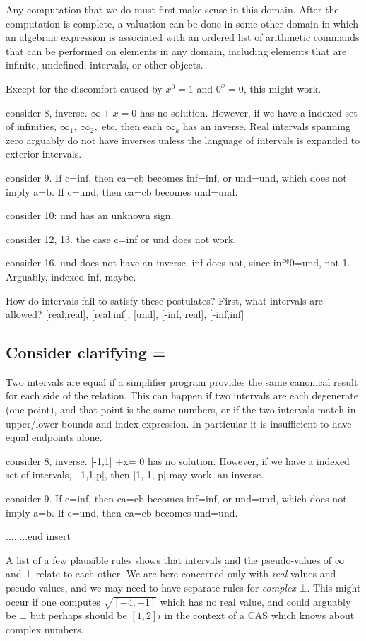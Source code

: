 \documentclass{article}
\begin{document}
Any computation that we do must first make sense in this domain. After
the computation is complete, a valuation can be done in some other
domain in which an algebraic expression is associated with an ordered
list of arithmetic commands that can be performed on elements in any
domain, including elements that are infinite, undefined, intervals, or
other objects.

Except for the discomfort caused by $ x^0=1$ and   $0^x=0$, this might work.


consider 8, inverse. $\infty+x= 0$ has no solution. However, if we have a
indexed set of infinities, $\infty_1,~\infty_2,$ etc.  then each $\infty_k$ has
an inverse. Real intervals spanning zero arguably do not have inverses
unless the language of intervals is expanded to exterior intervals.

consider 9. If c=inf, then ca=cb becomes inf=inf, or und=und, which does not imply a=b. 
 If c=und, then ca=cb becomes und=und.

consider 10: und has an unknown sign.

consider 12, 13. the case c=inf or und does not work.

consider 16.  und does not have an inverse. inf does not, since inf*0=und, not 1.
Arguably, indexed inf, maybe.


How do intervals fail to satisfy these postulates?
First, what intervals are allowed?
[real,real], [real,inf], [und], [-inf, real], [-inf,inf]


\subsection*{Consider clarifying =}
 Two intervals are equal if a simplifier
program provides the same canonical result for each side of the
relation. This can happen if two intervals are each degenerate (one
point), and that point is the same numbers, or if the two intervals
match in upper/lower bounds and index expression.  In particular it is
insufficient to have equal endpoints alone.


consider 8, inverse. [-1,1] +x= 0 has no solution. However, if we have
a indexed set of intervals, [-1,1,p], then [1,-1,-p] may work.
an inverse.

consider 9. If c=inf, then ca=cb becomes inf=inf, or und=und, which does not imply a=b.  If c=und, then ca=cb becomes und=und.


........end insert

A list of a few plausible rules shows that intervals and the pseudo-values
of $\infty$ and $\bot$ relate to each other. We are here concerned
only with {\em real} values and pseudo-values, and we may need to have separate
rules for {\em complex} $\bot$. This might occur if one computes  $\sqrt{[-4,-1]}$ 
which has no real value, and could arguably be $\bot$  but perhaps should be $[1,2]i$
in the context of a CAS which knows about complex numbers.
\end{document}
